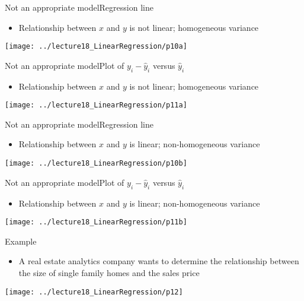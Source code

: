 \documentclass[xcolor=dvipsnames]{beamer}
\begin{document}
\begin{frame}{Not an appropriate model}{Regression line}
\begin{itemize}
	\item Relationship between $x$ and $y$ is not linear; homogeneous variance
\end{itemize}
\begin{center}
	\texttt{[image: ../lecture18\_LinearRegression/p10a]}
\end{center}
\end{frame}

\begin{frame}{Not an appropriate model}{Plot of $y_i - \hat{y}_i$ versus $\hat{y}_i$}
\begin{itemize}
\item Relationship between $x$ and $y$ is not linear; homogeneous variance
\end{itemize}
\begin{center}
\texttt{[image: ../lecture18\_LinearRegression/p11a]}
\end{center}
\end{frame}

\begin{frame}{Not an appropriate model}{Regression line}
\begin{itemize}
	\item Relationship between $x$ and $y$ is linear; non-homogeneous variance
\end{itemize}
\begin{center}
	\texttt{[image: ../lecture18\_LinearRegression/p10b]}
\end{center}
\end{frame}

\begin{frame}{Not an appropriate model}{Plot of $y_i - \hat{y}_i$ versus $\hat{y}_i$}
\begin{itemize}
\item Relationship between $x$ and $y$ is linear; non-homogeneous variance
\end{itemize}
\begin{center}
\texttt{[image: ../lecture18\_LinearRegression/p11b]}
\end{center}
\end{frame}

\begin{frame}{Example}
\begin{itemize}
	\item A real estate analytics company wants to determine the relationship between the size of single family homes and the sales price
\end{itemize}
	\begin{center}
	\texttt{[image: ../lecture18\_LinearRegression/p12]}
\end{center}
\end{frame}
\end{document}
